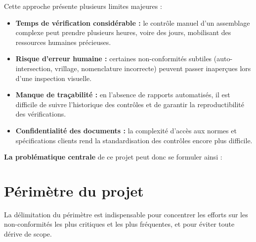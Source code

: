 Cette approche présente plusieurs limites majeures :

\begin{itemize}
    \item[•] \textbf{Temps de vérification considérable :} le contrôle manuel d'un assemblage complexe peut prendre plusieurs heures, voire des jours, mobilisant des ressources humaines précieuses.
    \item[•] \textbf{Risque d'erreur humaine :} certaines non-conformités subtiles (auto-intersection, vrillage, nomenclature incorrecte) peuvent passer inaperçues lors d'une inspection visuelle.
    \item[•] \textbf{Manque de traçabilité :} en l'absence de rapports automatisés, il est difficile de suivre l'historique des contrôles et de garantir la reproductibilité des vérifications.
    \item[•] \textbf{Confidentialité des documents :} la complexité d'accès aux normes et spécifications clients rend la standardisation des contrôles encore plus difficile.
\end{itemize}

\textbf{La problématique centrale} de ce projet peut donc se formuler ainsi :

\begin{center}
\end{center}

\section{Périmètre du projet}

La délimitation du périmètre est indispensable pour concentrer les efforts sur les non-conformités les plus critiques et les plus fréquentes, et pour éviter toute dérive de scope.


